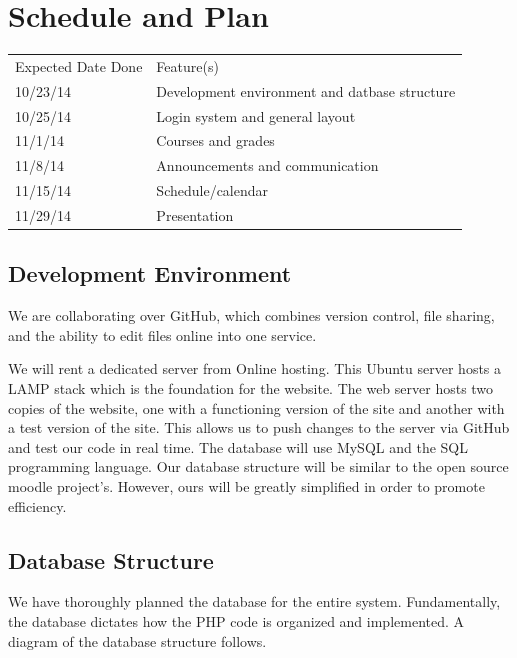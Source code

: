 \documentclass{article}
\begin{document}
\section{Schedule and Plan}

\vspace{10 pt}

\begin{tabular}{ll}
    Expected Date Done&Feature(s)\\
    10/23/14&Development environment and datbase structure\\
    10/25/14&Login system and general layout\\
    11/1/14&Courses and grades\\
    11/8/14&Announcements and communication\\
    11/15/14&Schedule/calendar\\
    11/29/14&Presentation\\
\end{tabular}

\subsection{Development Environment}

We are collaborating over GitHub, which combines version control, file sharing,
and the ability to edit files online into one service.

We will rent a dedicated server from Online hosting. This Ubuntu server hosts a
LAMP stack which is the foundation for the website. The web server hosts two
copies of the website, one with a functioning version of the site and another
with a test version of the site. This allows us to push changes to the server
via GitHub and test our code in real time. The database will use MySQL and the
SQL programming language. Our database structure will be similar to the open
source moodle project's. However, ours will be greatly simplified in order to
promote efficiency.

\subsection{Database Structure}

We have thoroughly planned the database for the entire system. Fundamentally,
the database dictates how the PHP code is organized and implemented. A diagram
of the database structure follows.
\end{document}
